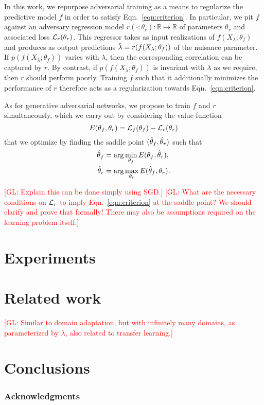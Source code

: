 \documentclass{article}
\newcommand{\glnote}[1]{\textcolor{red}{[GL: #1]}}
\theoremstyle{plain}
\begin{document}
In this work, we repurpose adversarial training as a means to regularize the
predictive model $f$ in order to satisfy Eqn.~\ref{eqn:criterion}. In
particular, we pit $f$ against an adversary regression model $r(\cdot ;
\theta_r) : \mathbb{R} \mapsto \mathbb{R}$ of parameters $\theta_r$ and
associated loss ${\cal L}_r(\theta_r)$. This regressor takes as input realizations of $f(X_\lambda; \theta_f)$
and produces as output predictions $\smash{\hat\lambda} = r(f(X_\lambda; \theta_f))$
of the nuisance parameter. If $p(f(X_\lambda; \theta_f))$ varies with $\lambda$,
then the corresponding correlation can be captured by $r$. By contrast, if
$p(f(X_\lambda; \theta_f))$ is invariant with $\lambda$ as we require, then $r$
should perform poorly. Training $f$ such that it additionally minimizes the performance of $r$
therefore acts as a regularization towards Eqn.~\ref{eqn:criterion}.

As for generative adversarial networks, we propose to
train $f$ and $r$ simultaneously, which we carry out by considering
the value function
\begin{equation}
    E(\theta_f, \theta_r) = {\cal L}_f(\theta_f) - {\cal L}_r(\theta_r)
\end{equation}
that we optimize by finding the saddle point $(\smash{\hat\theta_f}, \smash{\hat\theta_r})$ such that
\begin{align}
    \smash{\hat\theta_f} &= \arg \min_{\theta_f} E(\theta_f, \smash{\hat\theta_r}), \\
    \smash{\hat\theta_r} &= \arg \max_{\theta_r} E(\smash{\hat\theta_f}, \theta_r).
\end{align}

\glnote{Explain this can be done simply using SGD.}
\glnote{What are the necessary conditions on ${\cal L}_r$ to imply
Eqn.~\ref{eqn:criterion} at the saddle point? We should clarify and prove that
formally! There may also be assumptions required on the learning problem itself.}

\section{Experiments}

\section{Related work}

\glnote{Similar to domain adaptation, but with infinitely many domains,
as parameterized by $\lambda$, also related to transfer learning.}

\section{Conclusions}

\subsubsection*{Acknowledgments}


{\small
}
\end{document}

